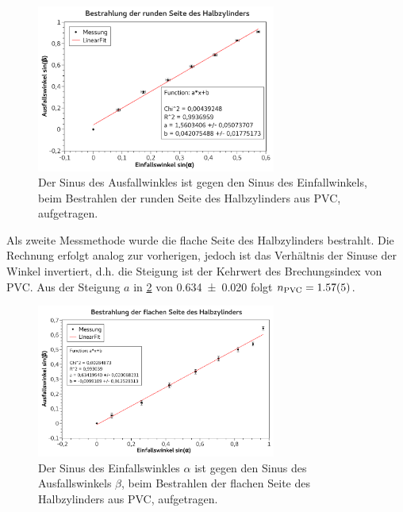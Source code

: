 \documentclass[
	a4paper,
	12pt,
	pagesize,
	ngerman
]{scrartcl}
\begin{document}
	\begin{figure}[H]
		\includegraphics[width=0.7\textwidth]{fig_rund_zyl}
		\centering
		\caption{Der Sinus des Ausfallwinkles ist gegen den Sinus des Einfallwinkels, beim Bestrahlen der runden Seite des Halbzylinders aus PVC, aufgetragen.}
		\label{fig_rund_zyl}
		\centering
	\end{figure}

	Als zweite Messmethode wurde die flache Seite des Halbzylinders bestrahlt.
	Die Rechnung erfolgt analog zur vorherigen, jedoch ist das Verhältnis der Sinuse der Winkel invertiert, d.h. die Steigung ist der Kehrwert des Brechungsindex von PVC.
	Aus der Steigung $a$ in \cref{fig_flach_zyl} von \SI{0,634+-0,020}{} folgt $n_\text{PVC} = \SI{1,57 +- 0,05}{}$.
	\begin{figure}[H]
		\includegraphics[width=0.7\textwidth]{fig_flach_zyl}
		\centering
		\caption{Der Sinus des Einfallswinkles $\alpha$ ist gegen den Sinus des Ausfallswinkels $\beta$, beim Bestrahlen der flachen Seite des Halbzylinders aus PVC, aufgetragen.}
		\label{fig_flach_zyl}
		\centering
	\end{figure}
\end{document}
